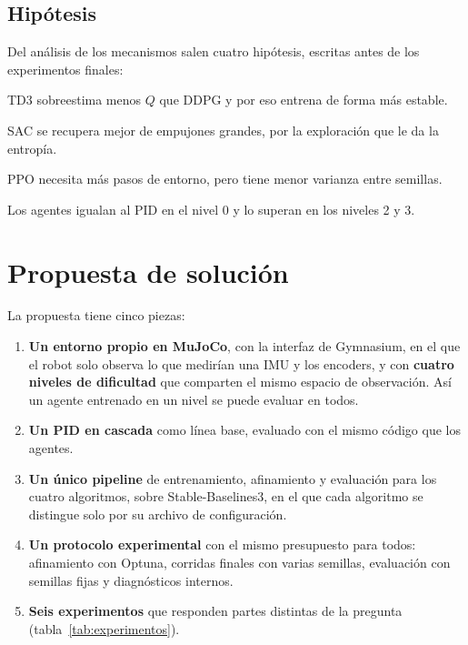 \documentclass[11pt,a4paper]{article}
\begin{document}
\subsection{Hipótesis}

Del análisis de los mecanismos salen cuatro hipótesis, escritas antes de los experimentos finales:
\begin{description}[font=\normalfont\bfseries]
  \item[H1] TD3 sobreestima menos $Q$ que DDPG y por eso entrena de forma más estable.
  \item[H2] SAC se recupera mejor de empujones grandes, por la exploración que le da la entropía.
  \item[H3] PPO necesita más pasos de entorno, pero tiene menor varianza entre semillas.
  \item[H4] Los agentes igualan al PID en el nivel 0 y lo superan en los niveles 2 y 3.
\end{description}

\section{Propuesta de solución}

La propuesta tiene cinco piezas:
\begin{enumerate}
  \item \textbf{Un entorno propio en MuJoCo}, con la interfaz de Gymnasium, en el que el robot solo observa lo que medirían una IMU y los encoders, y con \textbf{cuatro niveles de dificultad} que comparten el mismo espacio de observación. Así un agente entrenado en un nivel se puede evaluar en todos.
  \item \textbf{Un PID en cascada} como línea base, evaluado con el mismo código que los agentes.
  \item \textbf{Un único pipeline} de entrenamiento, afinamiento y evaluación para los cuatro algoritmos, sobre Stable-Baselines3, en el que cada algoritmo se distingue solo por su archivo de configuración.
  \item \textbf{Un protocolo experimental} con el mismo presupuesto para todos: afinamiento con Optuna, corridas finales con varias semillas, evaluación con semillas fijas y diagnósticos internos.
  \item \textbf{Seis experimentos} que responden partes distintas de la pregunta (tabla~\ref{tab:experimentos}).
\end{enumerate}
\end{document}
